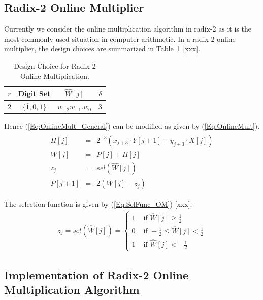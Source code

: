 \documentclass[a4paper, 11pt]{article}
\begin{document}
\subsection{Radix-2 Online Multiplier}
Currently we consider the online multiplication algorithm in radix-2 as it is the most commonly used situation in computer arithmetic. In a radix-2 online multiplier, the design choices are summarized in Table~\ref{Tab:Radix2_OM_Parameter} [xxx]. 
%
\begin{table}[htbp]
\caption{Design Choice for Radix-2 Online Multiplication.}
\centering
\begin{tabular}{c|c|c|c}
 \hline
 \hline
 $r$ & Digit Set & $\widehat{W}[j]$  & $\delta$ \\ 
 \hline
 $2$ & $\{\bar{1},0,1\}$ & $w_{-2}w_{-1}.w_{0}$ & $3$\\
 \hline
 \hline 
\end{tabular}
\label{Tab:Radix2_OM_Parameter}
\end{table}

Hence (\ref{Eq:OnlineMult_General}) can be modified as given by (\ref{Eq:OnlineMult}).
%
\begin{eqnarray}\label{Eq:OnlineMult}
  \begin{matrix}
    H[j] & = & 2^{-3}(x_{j+3}\cdot Y[j+1]+y_{j+3}\cdot X[j])\\
    W[j] & = & P[j]+H[j]\\
    z_j  & = & sel(\widehat{W}[j])\\
    P[j+1] & = & 2(W[j]-z_j)
  \end{matrix}
\end{eqnarray}

The selection function is given by (\ref{Eq:SelFunc_OM}) [xxx].
\begin{eqnarray}\label{Eq:SelFunc_OM}
  z_j=sel(\widehat{W}[j])=\begin{cases}
    1 & \text{ if } \widehat{W}[j] \geqslant \frac{1}{2} \\ 
    0 & \text{ if } -\frac{1}{2}\leqslant\widehat{W}[j]<\frac{1}{2} \\ 
    \bar{1} & \text{ if } \widehat{W}[j]<-\frac{1}{2}
  \end{cases}
\end{eqnarray}

\subsection{Implementation of Radix-2 Online Multiplication Algorithm}
\end{document}
